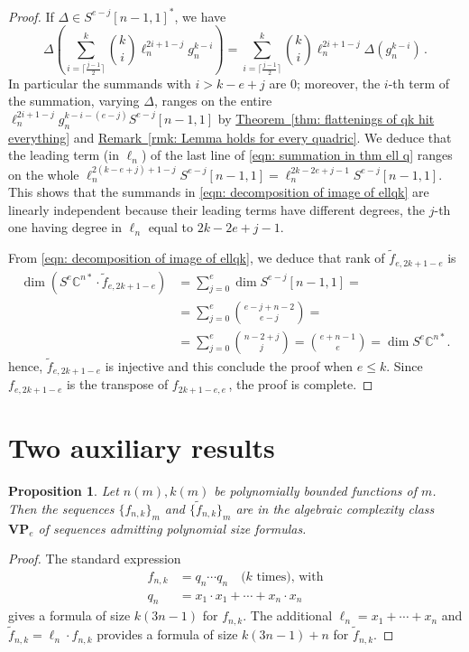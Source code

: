 \documentclass[11pt]{article}
\numberwithin{equation}{section}
\newtheorem{proposition}[theorem]{Proposition}
\theoremstyle{definition}
\theoremstyle{plain}
\newcommand{\expref}[2]{\hyperref[#2]{#1~\ref{#2}}}
\providecommand{\textbinom}{}
\renewcommand{\textbinom}[2]{{\textstyle \binom{#1}{#2}}}
\newcommand{\bbC}{\mathbb{C}}
\renewcommand{\tilde}[1]{\widetilde{#1}}
\newcommand{\bfVP}{\mathbf{VP}}
\begin{document}
\begin{proof}
If $\Delta \in S^{e-j} [n-1,1]^* $, we have
\[
  \Delta \left( \sum_{i=\lceil \frac{j-1}{2}\rceil}^k \textbinom{k}{i} \ell_n^{2i+1 - j} g_n^{k-i}\right) = \sum_{i=\lceil \frac{j-1}{2}\rceil}^{k} \textbinom{k}{i} \ell_n^{2i+1 - j} \Delta( g_n^{k-i})\,.
\]
In particular the summands with $i > k-e+j$ are $0$; moreover, the
$i$-th term of the summation, varying $\Delta$, ranges on the entire
$\ell_n^{2i+1-j} g_n^{k-i-(e-j)} S^{e-j} [n-1,1]$ by
\expref{Theorem}{thm: flattenings of qk hit everything} and
\expref{Remark}{rmk: Lemma holds for every quadric}. We deduce that
the leading term (in $\ell_n$) of the last line of \eqref{eqn:
  summation in thm ell q} ranges on the whole
$\ell_n^{2(k-e+j) +1 -j } S^{e-j} [n-1,1] = \ell_n^{2k-2e+j -1}
S^{e-j} [n-1,1]$. This shows that the summands in \eqref{eqn:
  decomposition of image of ellqk} are linearly independent because
their leading terms have different degrees, the $j$-th one having
degree in $\ell_n$ equal to $2k-2e+j -1$.

{}From \eqref{eqn: decomposition of image of ellqk}, we deduce that rank of $\tilde{f}_{e,2k+1-e}$ is 
\begin{align*}
 \dim (S^e \bbC^{n*} \cdot \tilde{f}_{e,2k+1-e} ) &= \sum_{j = 0}^e \dim S^{e-j} [n-1,1] = \\ &= \sum_{j=0}^e \binom{e-j+n-2}{e-j} = \\ &=\sum_{j=0}^e \binom{n-2+j}{j} = \binom{e+n-1}{e} = \dim S^e \bbC^{n*}.
\end{align*}
hence, $\tilde{f}_{e,2k+1-e}$ is injective and this conclude the proof when $e \leq k$. Since $f_{e,2k+1-e}$ is the transpose of $f_{2k+1-e,e}$\,, the proof is complete.
\end{proof}


\section{Two auxiliary results}
 
 
  \begin{proposition} \label{vpeprop}
 Let $n(m),k(m)$ be   polynomially bounded functions of $m$. Then the sequences $\{f_{n,k}\}_m$ and $\{\tilde f_{n,k}\}_m$ are   in the algebraic complexity class $\bfVP_e$ of sequences admitting polynomial size formulas.
 \end{proposition}  
 

\begin{proof}
The standard expression
\begin{align*}
f_{n,k} &= q_n \cdots q_n \quad \text{($k$ times), with} \\
q_n &= x_1 \cdot x_1 + \cdots + x_n \cdot x_n
\end{align*}
gives a formula of size $k(3n-1)$ for $f_{n,k}$. The additional $\ell_n = x_1 + \cdots + x_n$ and $\tilde{f}_{n,k} = \ell_n \cdot f_{n,k}$ provides a formula of size $k(3n-1)+n$ for $\tilde{f}_{n,k}$.
\end{proof}
\end{document}
